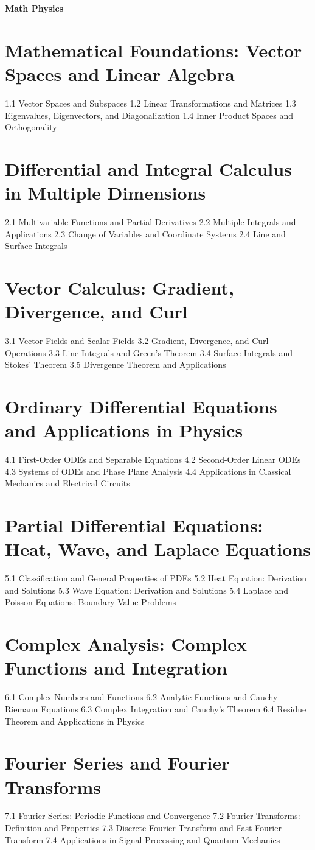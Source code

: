 {\LARGE \bf{Math Physics}}
\section{Mathematical Foundations: Vector Spaces and Linear Algebra}
1.1 Vector Spaces and Subspaces
1.2 Linear Transformations and Matrices
1.3 Eigenvalues, Eigenvectors, and Diagonalization
1.4 Inner Product Spaces and Orthogonality
\section{Differential and Integral Calculus in Multiple Dimensions}
2.1 Multivariable Functions and Partial Derivatives
2.2 Multiple Integrals and Applications
2.3 Change of Variables and Coordinate Systems
2.4 Line and Surface Integrals
\section{Vector Calculus: Gradient, Divergence, and Curl}
3.1 Vector Fields and Scalar Fields
3.2 Gradient, Divergence, and Curl Operations
3.3 Line Integrals and Green's Theorem
3.4 Surface Integrals and Stokes' Theorem
3.5 Divergence Theorem and Applications
\section{Ordinary Differential Equations and Applications in Physics}
4.1 First-Order ODEs and Separable Equations
4.2 Second-Order Linear ODEs
4.3 Systems of ODEs and Phase Plane Analysis
4.4 Applications in Classical Mechanics and Electrical Circuits
\section{Partial Differential Equations: Heat, Wave, and Laplace Equations}
5.1 Classification and General Properties of PDEs
5.2 Heat Equation: Derivation and Solutions
5.3 Wave Equation: Derivation and Solutions
5.4 Laplace and Poisson Equations: Boundary Value Problems
\section{Complex Analysis: Complex Functions and Integration}
6.1 Complex Numbers and Functions
6.2 Analytic Functions and Cauchy-Riemann Equations
6.3 Complex Integration and Cauchy's Theorem
6.4 Residue Theorem and Applications in Physics
\section{Fourier Series and Fourier Transforms}
7.1 Fourier Series: Periodic Functions and Convergence
7.2 Fourier Transforms: Definition and Properties
7.3 Discrete Fourier Transform and Fast Fourier Transform
7.4 Applications in Signal Processing and Quantum Mechanics
